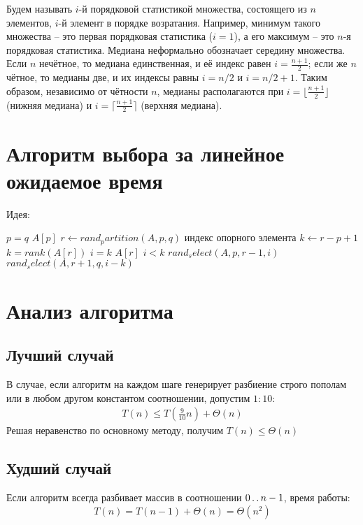 \documentclass[11pt]{article}
\begin{document}
Будем называть $i$-й порядковой статистикой множества, состоящего из $n$ элементов, $i$-й элемент в порядке возратания. Например, минимум такого множества -- это первая порядковая статистика ($i = 1$), а его максимум -- это $n$-я порядковая статистика. Медиана неформально обозначает середину множества. Если $n$ нечётное, то медиана единственная, и её индекс равен $i = \frac{n+1}{2}$; если же $n$ чётное, то медианы две, и их индексы равны $i=n/2$ и $i=n/2 +1$. Таким образом, независимо от чётности $n$, медианы располагаются при $i = \lfloor \frac{n+1}{2} \rfloor$ (нижняя медиана) и $i = \lceil \frac{n+1}{2} \rceil$ (верхняя медиана).

\section{Алгоритм выбора за линейное ожидаемое время}
Идея:

\begin{codebox}
\li \If $p = q$
\li \Then \Return $A[p]$
\li $r \gets rand_partition(A, p, q)$ \Comment индекс опорного элемента
\li $k \gets r - p + 1$ \Comment $k = rank(A[r])$
\li \If $i = k$
\li \Then \Return $A[r]$
\li \ElseIf $i < k$
\li \Then \Return $rand_select(A, p, r-1, i)$
\li \Else \Return $rand_select(A, r+1, q, i-k)$
  \End
\End
\end{codebox}

\section{Анализ алгоритма}

\subsection{Лучший случай}
В случае, если алгоритм на каждом шаге генерирует разбиение строго пополам или в любом другом константом соотношении, допустим $1:10$:
\begin{align*}
  T(n) \leqslant T(\frac{9}{10}n) + \Theta(n)
\end{align*}
Решая неравенство по основному методу, получим $T(n) \leqslant \Theta(n)$

\subsection{Худший случай}
Если алгоритм всегда разбивает массив в соотношении $0 \mathinner{\ldotp\ldotp} n-1$, время работы:
\begin{equation*}
  T(n) = T(n-1) + \Theta(n) = \Theta(n^2)
\end{equation*}
\end{document}
